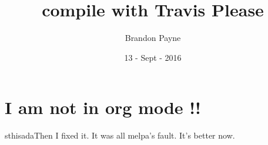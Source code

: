 \documentclass[koma, a4paper, utopia, 12pt]{article}
\author{Brandon Payne}
\date{13 - Sept - 2016}
\title{compile with Travis Please}
\begin{document}
\maketitle


\section{I am not in org mode !!}
\label{sec:orgheadline1}

sthisadaThen I fixed it.
It was all melpa's fault.  It's better now.
\end{document}
